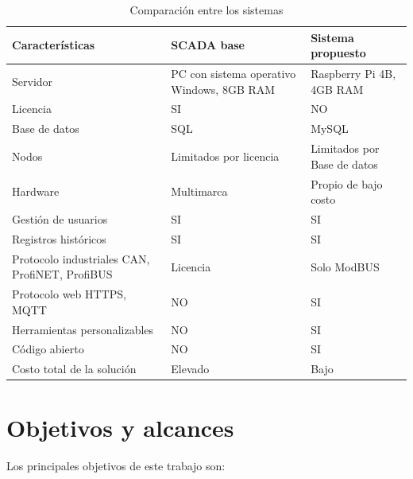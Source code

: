 \begin{table}[H]
	\begin{center}
		\caption[Comparación entre los sistemas]{Comparación entre los sistemas}
		\label{tab:comparacion}
		\begin{tabular}{ |m{4cm}  | m{4cm}  | m{4cm}| }\hline
			Características & SCADA base  & Sistema propuesto \\ \hline
			Servidor & PC con sistema operativo Windows, 8GB RAM & Raspberry Pi 4B, 4GB RAM \\ \hline
			Licencia & SI & NO \\\hline
			Base de datos & SQL & MySQL \\\hline
			Nodos  & Limitados por licencia & Limitados por Base de datos \\\hline
			Hardware & Multimarca & Propio de bajo costo \\	\hline		
			Gestión de usuarios & SI & SI \\	\hline		
			Registros históricos & SI & SI \\	\hline
			Protocolo industriales CAN, ProfiNET, ProfiBUS & Licencia & Solo ModBUS \\	\hline
			Protocolo web HTTPS, MQTT & NO & SI \\	\hline
			Herramientas personalizables & NO & SI \\	\hline
			Código abierto & NO & SI \\ \hline
			Costo total de la solución & Elevado & Bajo\\ \hline
		\end{tabular}
	\end{center}
\end{table}



\section{Objetivos y alcances}

Los principales objetivos de este trabajo son:\\ 


